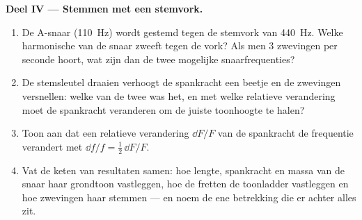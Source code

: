 \begin{problem}
\medskip
\noindent\textbf{Deel IV --- Stemmen met een stemvork.}
\begin{enumerate}[resume]
  \item De A-snaar (\qty{110}{Hz}) wordt gestemd tegen de stemvork van
        \qty{440}{Hz}. Welke harmonische van de snaar zweeft tegen de vork? Als
        men \qty{3}{} zwevingen per seconde hoort, wat zijn dan de twee mogelijke
        snaarfrequenties?
  \item De stemsleutel draaien verhoogt de spankracht een beetje en de
        zwevingen versnellen: welke van de twee was het, en met welke relatieve
        verandering moet de spankracht veranderen om de juiste toonhoogte te halen?
  \item Toon aan dat een relatieve verandering $\dd F/F$ van de spankracht de
        frequentie verandert met $\dd f/f = \tfrac12\,\dd F/F$.
  \item Vat de keten van resultaten samen: hoe lengte, spankracht en massa van
        de snaar haar grondtoon vastleggen, hoe de fretten de toonladder
        vastleggen en hoe zwevingen haar stemmen --- en noem de ene betrekking
        die er achter alles zit.
\end{enumerate}
\end{problem}
